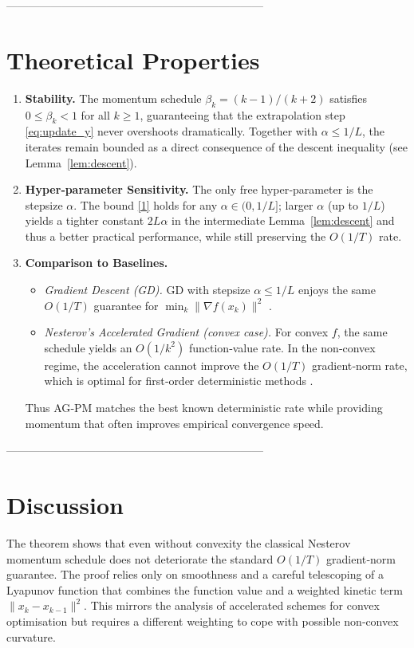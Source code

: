 \documentclass{article}
\newcommand{\grad}{\nabla}
\begin{document}
---------------------------------------------------------------------

\section*{Theoretical Properties}
\begin{enumerate}[label=\arabic*.]
\item \textbf{Stability.} The momentum schedule $\beta_k=(k-1)/(k+2)$ satisfies $0\le\beta_k<1$ for all $k\ge1$, guaranteeing that the extrapolation step \eqref{eq:update_y} never overshoots dramatically. Together with $\alpha\le1/L$, the iterates remain bounded as a direct consequence of the descent inequality (see Lemma~\ref{lem:descent}).

\item \textbf{Hyper‑parameter Sensitivity.} The only free hyper‑parameter is the stepsize $\alpha$. The bound \eqref{1} holds for any $\alpha\in(0,1/L]$; larger $\alpha$ (up to $1/L$) yields a tighter constant $2L\alpha$ in the intermediate Lemma~\ref{lem:descent} and thus a better practical performance, while still preserving the $O(1/T)$ rate.

\item \textbf{Comparison to Baselines.}
\begin{itemize}
\item \emph{Gradient Descent (GD).} GD with stepsize $\alpha\le1/L$ enjoys the same $O(1/T)$ guarantee for $\min_k\|\grad f(x_k)\|^2$ \cite{GhadimiLan2016}.
\item \emph{Nesterov’s Accelerated Gradient (convex case).} For convex $f$, the same schedule yields an $O(1/k^2)$ function‑value rate. In the non‑convex regime, the acceleration cannot improve the $O(1/T)$ gradient‑norm rate, which is optimal for first‑order deterministic methods \cite{Carmon2020}.
\end{itemize}
Thus AG‑PM matches the best known deterministic rate while providing momentum that often improves empirical convergence speed.
\end{enumerate}

---------------------------------------------------------------------

\section*{Discussion}
The theorem shows that even without convexity the classical Nesterov momentum schedule does not deteriorate the standard $O(1/T)$ gradient‑norm guarantee. The proof relies only on smoothness and a careful telescoping of a Lyapunov function that combines the function value and a weighted kinetic term $\|x_k-x_{k-1}\|^2$. This mirrors the analysis of accelerated schemes for convex optimisation but requires a different weighting to cope with possible non‑convex curvature.
\end{document}
